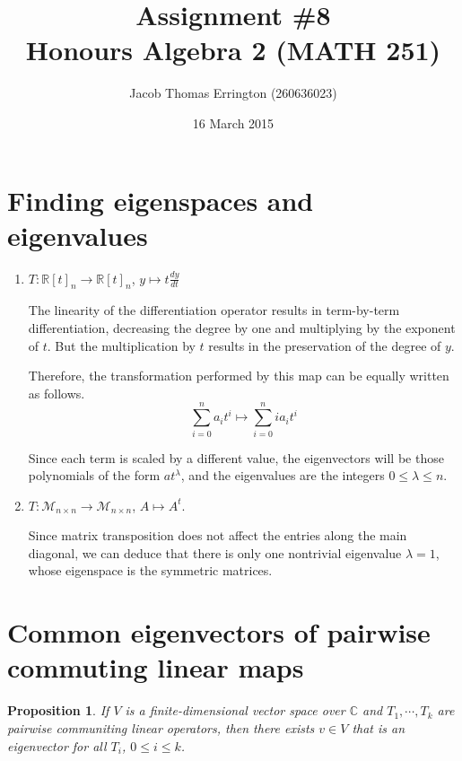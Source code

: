 \documentclass{article}
\author{Jacob Thomas Errington (260636023)}
\title{Assignment \#8\\Honours Algebra 2 (MATH 251)}
\date{16 March 2015}
\newtheorem{proposition}{Proposition}
\begin{document}
\maketitle

\section{Finding eigenspaces and eigenvalues}

\begin{enumerate}
    \item $T : \mathbb{R}[t]_n \to \mathbb{R}[t]_n$,
        $y \mapsto t \frac{dy}{dt}$

        The linearity of the differentiation operator results in term-by-term
        differentiation, decreasing the degree by one and multiplying by the
        exponent of $t$.  But the multiplication by $t$ results in the
        preservation of the degree of $y$.

        Therefore, the transformation performed by this map can be equally
        written as follows.
        \begin{equation}
            \sum_{i=0}^n {a_i t^i} \mapsto \sum_{i=0}^n {i a_i t^i}
        \end{equation}

        Since each term is scaled by a different value, the eigenvectors will
        be those polynomials of the form $at^\lambda$, and the eigenvalues are
        the integers $0 \leq \lambda \leq n$.

    \item $T : \mathcal{M}_{n \times n} \to \mathcal{M}_{n \times n}$,
        $A \mapsto A^t$.

        Since matrix transposition does not affect the entries along the main
        diagonal, we can deduce that there is only one nontrivial eigenvalue
        $\lambda = 1$, whose eigenspace is the symmetric matrices.
\end{enumerate}

\section{Common eigenvectors of pairwise commuting linear maps}

\begin{proposition}
    If $V$ is a finite-dimensional vector space over $\mathbb{C}$ and
    $T_1, \cdots, T_k$ are pairwise communiting linear operators, then there
    exists $v \in V$ that is an eigenvector for all $T_i$, $0 \leq i \leq k$.
\end{proposition}
\end{document}
